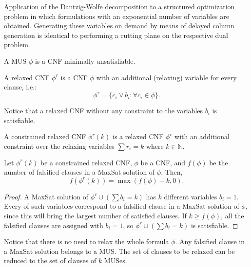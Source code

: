 \documentclass[runningheads,a4paper]{llncs}
\begin{document}
Application of the Dantzig-Wolfe
decomposition to a structured optimization problem in which
formulations with an exponential number of variables are
obtained. Generating these variables on demand by means of delayed
column generation is identical to performing a cutting plane on the
respective dual problem.


\begin{definition}[MUS]
A MUS $\phi$ is a CNF minimally unsatisfiable.
\end{definition}

\begin{definition}
A relaxed CNF $\phi^r$ is a CNF $\phi$ with an additional (relaxing)
variable for every clause, i.e.:
$$\phi^r = \{ c_i \vee b_i : \forall c_i \in \phi \}.$$
\end{definition}

Notice that a relaxed CNF without any constraint to the variables
$b_i$ is satisfiable. 

\begin{definition}
A constrained relaxed CNF $\phi^r(k)$ is a relaxed CNF $\phi^r$ with
an additional constraint over the relaxing variables $\sum r_i = k$
where $k\in \mathbb{N}$.
\end{definition}

\begin{lemma}
Let $\phi^r(k)$ be a constrained relaxed CNF, $\phi$ be a CNF,
and $f(\phi)$ be the number of falsified
clauses in a MaxSat solution of $\phi$. Then,
 $$f(\phi^r(k)) = \max(  f(\phi) - k, 0 ). $$
\end{lemma}

\begin{proof}
A MaxSat solution of $\phi^r \cup (\sum b_ i= k)$
has $k$ different variables $b_i = 1$. Every of such
variables correspond to a falsified clause in a MaxSat
solution of $\phi$, since this will bring the largest number of
satisfied clauses.
If $k \ge f(\phi)$, all the falsified clauses are assigned with $b_i =
1$, so  $\phi^r \cup (\sum b_ i= k)$ is satisfiable.
\end{proof}

Notice that there is no need to relax the whole formula $\phi$. Any falsified clause in a MaxSat
solution belongs to a MUS. 
The set of clauses to be relaxed can be reduced to the set of clauses
of $k$ MUSes.
\end{document}

